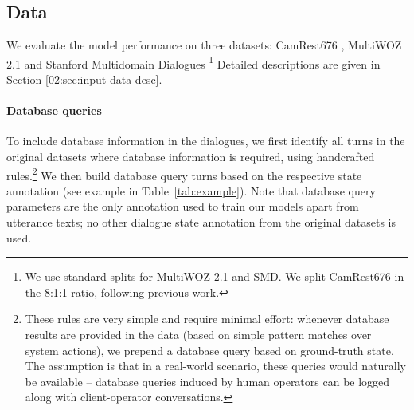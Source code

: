 \subsection{Data}
\label{sec:data}

We evaluate the model performance on three datasets: CamRest676 \cite{wen2016network}, MultiWOZ 2.1 \cite{budzianowski2018multiwoz,eric2019multiwoz} and Stanford Multidomain Dialogues \cite[SMD;][]{eric-etal-2017-key}\footnote{We use standard splits for MultiWOZ 2.1 and SMD. We split CamRest676 in the 8:1:1 ratio, following previous work.}
Detailed descriptions are given in Section \ref{02:sec:input-data-desc}.

\paragraph{Database queries} To include database information in the dialogues, we first identify all turns in the original datasets where database information is required, using handcrafted rules.\footnote{These rules are very simple and require minimal effort: whenever database results are provided in the data (based on simple pattern matches over system actions), we prepend a database query based on ground-truth state. The assumption is that in a real-world scenario, these queries would naturally be available -- database queries induced by human operators can be logged along with client-operator conversations.}
We then build database query turns based on the respective state annotation (see example in Table~\ref{tab:example}).
Note that database query parameters are the only annotation used to train our models apart from utterance texts; no other dialogue state annotation from the original datasets is used.
